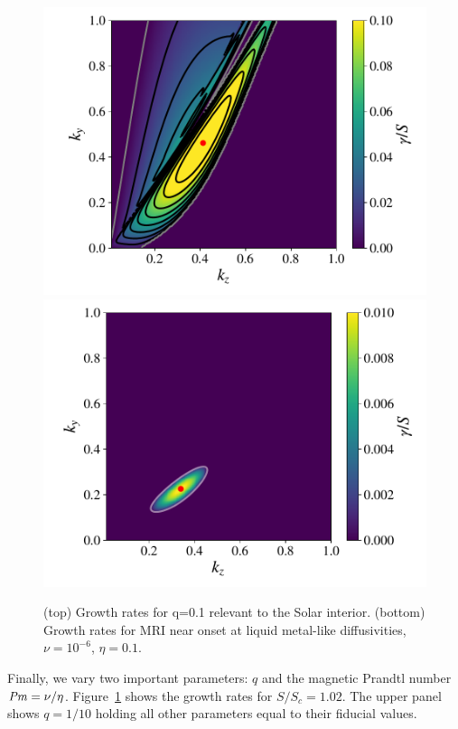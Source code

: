 \documentclass[aps,prl,reprint,superscriptaddress]{revtex4-1}
\newcommand{\SSC}{S/S_{c}}
\newcommand{\Prm}{\mbox{\textit{Pm}}}
\begin{document}
\begin{figure}[h!]
  \centering
  \includegraphics[width=\columnwidth]{run_47_output_growthrates.pdf}\\
  \includegraphics[width=\columnwidth]{run_49_output_growthrates.pdf}
  \caption{(top) Growth rates for q=0.1 relevant to the Solar interior. (bottom) Growth rates for MRI near onset at liquid metal-like diffusivities, $\nu=10^{-6}$, $\eta = 0.1$.}
  \label{fig:other_params}
\end{figure}
Finally, we vary two important parameters:
$q$ and the magnetic Prandtl number $\Prm = \nu/\eta$.
Figure~\ref{fig:other_params} shows the growth rates for $\SSC = 1.02$.
The upper panel shows $q = 1/10$ holding all other parameters equal to their fiducial values.
\end{document}
